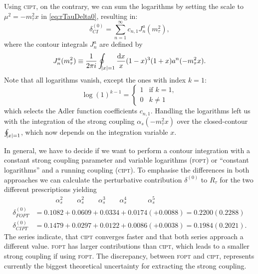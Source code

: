 \documentclass[../../index.tex]{subfiles}
\begin{document}
Using \textsc{cipt}, on the contrary, we can sum the logarithms by setting the
scale to \(\mu^2 = -m_\tau^2 x\) in \cref{eq:rTauDelta0}, resulting in:
\begin{equation}
  \delta^{(0)}_{CI} = \sum_{n=1}^\infty c_{n,1} J_n^a(m_\tau^2),
\end{equation}
where the contour integrals \(J_n^a\) are defined by
\begin{equation}
  J_n^a(m_\tau^2) \equiv \frac{1}{2 \pi i} \oint_{\abs{x}=1} \frac{\dif x}{x} (1-x)^3(1+x) a^n(-m_\tau^2 x).
\end{equation}
Note that all logarithms vanish, except the ones with index \(k=1\):
\begin{equation}
  \log(1)^{k-1} =  \begin{cases} \mbox{1} & \mbox{if } k=1, \\ \mbox{0} & k\neq 1 \end{cases}
\end{equation}
which selects the Adler function coefficients \(c_{n,1}\). Handling the
logarithms left us with the integration of the strong coupling \(\alpha_s(-
m_\tau^2 x)\) over the closed-contour \(\oint_{\abs{x}=1}\), which now depends
on the integration variable \(x\).

In general, we have to decide if we want to perform a contour integration with a
constant strong coupling parameter and variable logarithms (\textsc{fopt}) or
``constant logarithms'' and a running coupling (\textsc{cipt}). To emphasise the
differences in both approaches we can calculate the perturbative contribution
\(\delta^{(0)}\) to \(R_\tau\) for the two different prescriptions yielding
\cite{Beneke2008}
\begin{align}
  & \quad\qquad \alpha_s^2 \qquad \alpha_s^2 \qquad \alpha_s^3 \qquad \alpha_s^4 \quad\qquad \alpha_s^5 \nonumber\\
  \delta_{FOPT}^{(0)} &= 0.1082 + 0.0609 + 0.0334 + 0.0174 (+ 0.0088) = 0.2200 (0.2288) \\
  \delta_{CIPT}^{(0)} &= 0.1479 + 0.0297 + 0.0122 + 0.0086 (+ 0.0038) = 0.1984 (0.2021).
\end{align}
The series indicate, that \textsc{cipt} converges faster and that both series
approach a different value. \textsc{fopt} has larger contributions than
\textsc{cipt}, which leads to a smaller strong coupling if using \textsc{fopt}.
The discrepancy, between \textsc{fopt} and \textsc{cipt}, represents currently
the biggest theoretical uncertainty for extracting the strong coupling.
\end{document}

